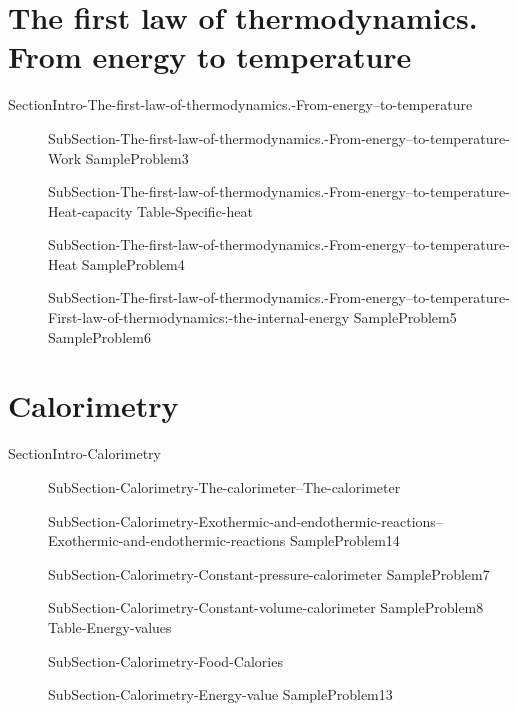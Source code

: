\documentclass[main.tex]{subfiles}
\begin{document}
\section{The first law of thermodynamics. From energy  to temperature}
{SectionIntro-The-first-law-of-thermodynamics.-From-energy--to-temperature}
\sloppy\begin{description}
\item[] 
  {SubSection-The-first-law-of-thermodynamics.-From-energy--to-temperature-Work}
   {SampleProblem3}
\item[] 
  {SubSection-The-first-law-of-thermodynamics.-From-energy--to-temperature-Heat-capacity}
   {Table-Specific-heat}
\item[] 
  {SubSection-The-first-law-of-thermodynamics.-From-energy--to-temperature-Heat}
   {SampleProblem4}
\item[] 
  {SubSection-The-first-law-of-thermodynamics.-From-energy--to-temperature-First-law-of-thermodynamics:-the-internal-energy}
   {SampleProblem5}
   {SampleProblem6}
\end{description}

\section{Calorimetry}
{SectionIntro-Calorimetry}
\sloppy\begin{description}
\item[] 
  {SubSection-Calorimetry-The-calorimeter--The-calorimeter}
\item[]  {SubSection-Calorimetry-Exothermic-and-endothermic-reactions--Exothermic-and-endothermic-reactions}
  {SampleProblem14}
\item[] {SubSection-Calorimetry-Constant-pressure-calorimeter}
   {SampleProblem7}
\item[]  {SubSection-Calorimetry-Constant-volume-calorimeter}
   {SampleProblem8}
\hspace{-2cm}{Figure-Calorimeter}
 {Table-Energy-values}

\item[]  {SubSection-Calorimetry-Food-Calories}
\item[]  {SubSection-Calorimetry-Energy-value}
 {SampleProblem13}

\end{description}
     
\end{document}

